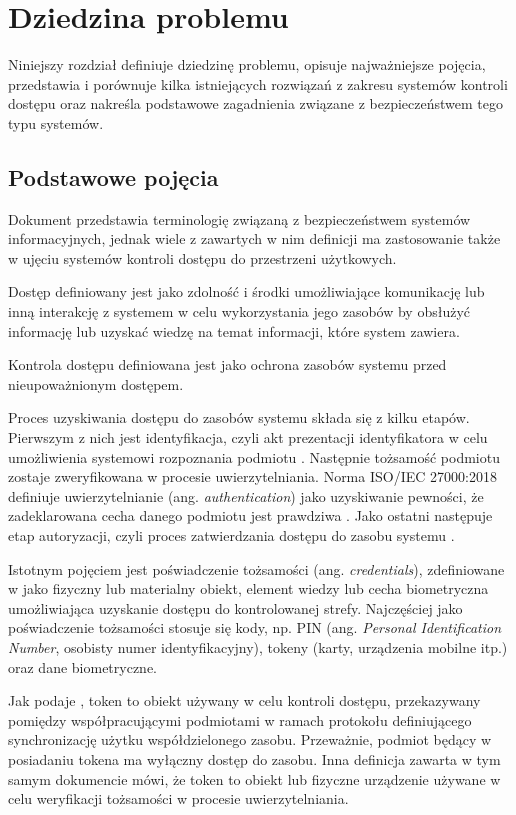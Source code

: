 \chapter{Dziedzina problemu}
\label{chap:problem-domain}

	Niniejszy rozdział definiuje dziedzinę problemu, opisuje najważniejsze pojęcia, przedstawia i porównuje kilka istniejących rozwiązań z zakresu systemów kontroli dostępu oraz nakreśla podstawowe zagadnienia związane z bezpieczeństwem tego typu systemów.

	\section{Podstawowe pojęcia}

		Dokument \cite{rfc4949} przedstawia terminologię związaną z bezpieczeństwem systemów informacyjnych, jednak wiele z zawartych w nim definicji ma zastosowanie także w ujęciu systemów kontroli dostępu do przestrzeni użytkowych.

		Dostęp definiowany jest jako zdolność i środki umożliwiające komunikację lub inną interakcję z systemem w celu wykorzystania jego zasobów by obsłużyć informację lub uzyskać wiedzę na temat informacji, które system zawiera.

		Kontrola dostępu definiowana jest jako ochrona zasobów systemu przed nieupoważnionym dostępem.

		Proces uzyskiwania dostępu do zasobów systemu składa się z kilku etapów. Pierwszym z nich jest identyfikacja, czyli akt prezentacji identyfikatora w celu umożliwienia systemowi rozpoznania podmiotu \cite{rfc4949}. Następnie tożsamość podmiotu zostaje zweryfikowana w procesie uwierzytelniania. Norma ISO/IEC 27000:2018 definiuje uwierzytelnianie (ang. \textit{authentication}) jako uzyskiwanie pewności, że zadeklarowana cecha danego podmiotu jest prawdziwa \cite{iso27000}. Jako ostatni następuje etap autoryzacji, czyli proces zatwierdzania dostępu do zasobu systemu \cite{rfc4949}.

		Istotnym pojęciem jest poświadczenie tożsamości (ang. \textit{credentials}), zdefiniowane w \cite{bsia2016} jako fizyczny lub materialny obiekt, element wiedzy lub cecha biometryczna umożliwiająca uzyskanie dostępu do kontrolowanej strefy. Najczęściej jako poświadczenie tożsamości stosuje się kody, np. PIN (ang. \textit{Personal Identification Number}, osobisty numer identyfikacyjny), tokeny (karty, urządzenia mobilne itp.) oraz dane biometryczne.

		Jak podaje \cite{rfc4949}, token to obiekt używany w celu kontroli dostępu, przekazywany pomiędzy współpracującymi podmiotami w ramach protokołu definiującego synchronizację użytku współdzielonego zasobu. Przeważnie, podmiot będący w posiadaniu tokena ma wyłączny dostęp do zasobu. Inna definicja zawarta w tym samym dokumencie mówi, że token to obiekt lub fizyczne urządzenie używane w celu weryfikacji tożsamości w procesie uwierzytelniania.


